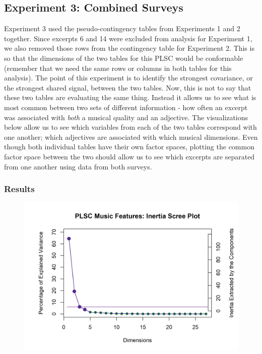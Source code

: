 \documentclass[
  english,
  man,floatsintext]{apa6}
\begin{document}
\hypertarget{experiment-3-combined-surveys}{%
\subsection{Experiment 3: Combined Surveys}\label{experiment-3-combined-surveys}}

Experiment 3 used the pseudo-contingency tables from Experiments 1 and 2 together. Since excerpts 6 and 14 were excluded from analysis for Experiment 1, we also removed those rows from the contingency table for Experiment 2. This is so that the dimensions of the two tables for this PLSC would be conformable (remember that we need the same rows or columns in both tables for this analysis). The point of this experiment is to identify the strongest covariance, or the strongest shared signal, between the two tables. Now, this is not to say that these two tables are evaluating the same thing. Instead it allows us to see what is most common between two sets of different information - how often an excerpt was associated with \emph{both} a musical quality and an adjective. The visualizations below allow us to see which variables from each of the two tables correspond with one another; which adjectives are associated with which musical dimensions. Even though both individual tables have their own factor spaces, plotting the common factor space between the two should allow us to see which excerpts are separated from one another using data from both surveys.

\hypertarget{results-1}{%
\subsubsection{Results}\label{results-1}}

\begin{figure}  
  \begin{center}
    \includegraphics{./Music-Descriptor-Space_files/figure-latex/screePLSC-1.png}
  \caption{ }\label{fig:screePLSC}  
 \end{center}
\end{figure}
\end{document}
